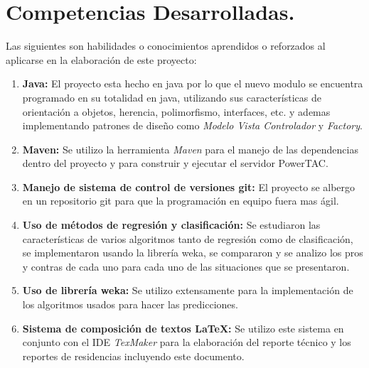 \section{Competencias Desarrolladas.}

Las siguientes son habilidades o conocimientos aprendidos o reforzados al aplicarse en la elaboración de este proyecto:
\begin{enumerate}
	\item \textbf{Java:} El proyecto esta hecho en java por lo que el nuevo modulo se encuentra programado en su totalidad en java, utilizando sus características de orientación a objetos,  herencia, polimorfismo, interfaces, etc. y ademas implementando patrones de diseño como \textit{Modelo Vista Controlador} y \textit{Factory}.
	
	\item \textbf{Maven:} Se utilizo la herramienta \textit{Maven} para el manejo de las dependencias dentro del proyecto y para construir y ejecutar el servidor PowerTAC.

	\item \textbf{Manejo de sistema de control de versiones git:} El proyecto se albergo en un repositorio git para que la programación en equipo fuera mas ágil.
	
	\item \textbf{Uso de métodos de regresión y clasificación:} Se estudiaron las características de varios algoritmos tanto de regresión como de clasificación, se implementaron usando la librería weka, se compararon y se analizo los pros y contras de cada uno para cada uno de las situaciones que se presentaron.

	\item \textbf{Uso de librería weka:} Se utilizo extensamente para la implementación de los algoritmos usados para hacer las predicciones.

	\item \textbf{Sistema de composición de textos \LaTeX{}:} Se utilizo este sistema en conjunto con el IDE \textit{TexMaker} para la elaboración del reporte técnico y los reportes de residencias incluyendo este documento.

\end{enumerate}
